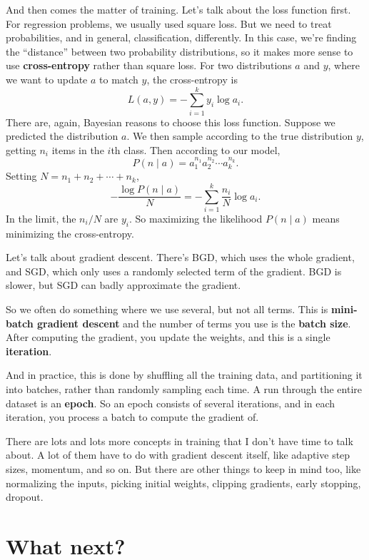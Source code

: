 \documentclass[11pt,paper=letter]{scrartcl}
\begin{document}
And then comes the matter of training. Let's talk about the loss function first. For regression problems, we usually used square loss. But we need to treat probabilities, and in general, classification, differently. In this case, we're finding the ``distance'' between two probability distributions, so it makes more sense to use \textbf{cross-entropy} rather than square loss. For two distributions $a$ and $y$, where we want to update $a$ to match $y$, the cross-entropy is
\[
  L(a, y) = -\sum_{i = 1}^k y_i \log a_i.
\]
There are, again, Bayesian reasons to choose this loss function. Suppose we predicted the distribution $a$. We then sample according to the true distribution $y$, getting $n_i$ items in the $i$th class. Then according to our model,
\[
  P(n \mid a) = a_1^{n_1}a_2^{n_2} \cdots a_k^{n_k}.
\]
Setting $N = n_1 + n_2 + \cdots + n_k$,
\[
  -\frac{\log P(n \mid a)}{N}
  = -\sum_{i=1}^k \frac{n_i}{N} \log a_i.
\]
In the limit, the $n_i / N$ are $y_i$. So maximizing the likelihood $P(n \mid a)$ means minimizing the cross-entropy.

Let's talk about gradient descent. There's BGD, which uses the whole gradient, and SGD, which only uses a randomly selected term of the gradient. BGD is slower, but SGD can badly approximate the gradient.

So we often do something where we use several, but not all terms. This is \textbf{mini-batch gradient descent} and the number of terms you use is the \textbf{batch size}. After computing the gradient, you update the weights, and this is a single \textbf{iteration}.

And in practice, this is done by shuffling all the training data, and partitioning it into batches, rather than randomly sampling each time. A run through the entire dataset is an \textbf{epoch}. So an epoch consists of several iterations, and in each iteration, you process a batch to compute the gradient of.

There are lots and lots more concepts in training that I don't have time to talk about. A lot of them have to do with gradient descent itself, like adaptive step sizes, momentum, and so on. But there are other things to keep in mind too, like normalizing the inputs, picking initial weights, clipping gradients, early stopping, dropout.

\clearpage

\section{What next?}
\end{document}
